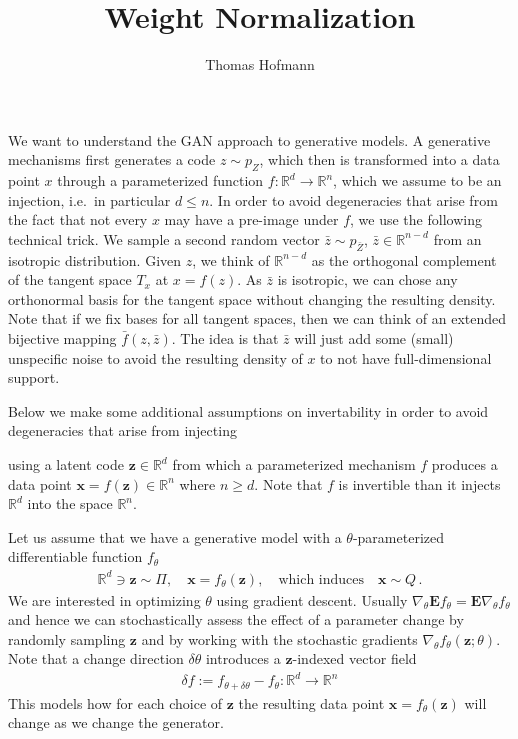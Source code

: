 \documentclass{article}
\title{Weight Normalization}
\author{Thomas Hofmann}
\renewcommand{\Re}{{\mathbb R}}
\newcommand{\E}{{\mathbf E}}
\newcommand{\z}{{\mathbf z}}
\newcommand{\x}{{\mathbf x}}
\begin{document}
We want to understand the GAN approach to generative models. A generative mechanisms first generates a code $z \sim p_Z$, which then is transformed into a data point $x$ through a parameterized function $f: \Re^d \to \Re^n$, which we assume to be an injection, i.e.~in particular $d \le n$.  In order to avoid degeneracies that arise from the fact that not every $x$ may have a pre-image under $f$, we use the following technical trick. We sample a second random vector $\bar z \sim p_{\bar Z}$, $\bar z \in  \Re^{n-d}$ from an isotropic distribution. Given $z$, we think of $\Re^{n-d}$ as the orthogonal complement of the tangent space $T_{x}$ at $x = f(z)$. As $\bar z$ is isotropic, we can chose any orthonormal basis for the tangent space without changing  the resulting density. Note that if we fix bases for all tangent spaces, then we can think of an extended bijective mapping $\bar f(z,\bar z)$. The idea is that $\bar z$ will just add some (small) unspecific noise to avoid the resulting density of $x$ to not have full-dimensional support. 


\newpage



Below we make some additional assumptions on invertability in order to avoid degeneracies that arise from injecting 


using a latent code $\z \in \Re^d$ from which a parameterized mechanism $f$ produces a data point $\x = f(\z) \in \Re^n$ where $n \ge d$. Note that $f$ is invertible than it injects $\Re^d$ into the space $\Re^n$. 


\newpage




Let us assume that we have a generative model with a $\theta$-parameterized differentiable function  $f_\theta$
\begin{align}
\Re^d \ni \z \sim \Pi, \quad \x = f_\theta(\z), \quad \text{which induces} \quad \x \sim Q\,.
\end{align}
 We are interested in optimizing $\theta$ using gradient descent. Usually $\nabla_\theta \E f_\theta = \E \nabla_\theta f_\theta$ and hence we can stochastically assess the effect of a parameter change by randomly sampling $\z$ and by working with the stochastic gradients $\nabla_\theta f_\theta(\z;\theta)$. \\

Note that a change direction $\delta \theta$ introduces a $\z$-indexed vector field
\begin{align}
\delta f := f_{\theta + \delta \theta} - f_\theta: \Re^d \to \Re^n 
\end{align}
This models how for each choice of $\z$ the resulting data point $\x = f_\theta(\z)$ will change as we change the generator. \\
\end{document}
